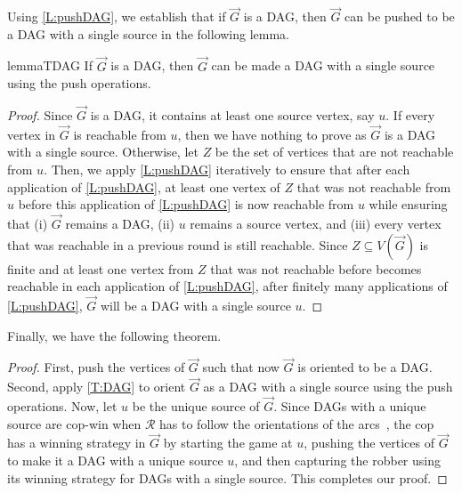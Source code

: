 \documentclass[a4paper,12pt]{amsart}
\newcommand{\R}{\mathcal{R}}
\begin{document}
Using \cref{L:pushDAG}, we establish that if $\overrightarrow{G}$ is a DAG, then $\overrightarrow{G}$ can be pushed to be a DAG with a single source in the following lemma. 
\begin{restatable}{lemma}{TDAG}\label{T:DAG}
    If $\overrightarrow{G}$ is a DAG, then $\overrightarrow{G}$ can be made a DAG with a single source using the push operations. 
\end{restatable}
\begin{proof}
    Since $\overrightarrow{G}$ is a DAG, it contains at least one source vertex, say $u$. If every vertex in $\overrightarrow{G}$ is reachable from $u$, then we have nothing to prove as $\overrightarrow{G}$ is a DAG with a single source. Otherwise, let $Z$ be the set of vertices that are not reachable from $u$. Then, we apply \cref{L:pushDAG} iteratively to ensure that after each application of \cref{L:pushDAG}, at least one vertex of $Z$ that was not reachable from $u$ before this application of \cref{L:pushDAG} is now reachable from $u$ while ensuring that (i) $\overrightarrow{G}$ remains a DAG, (ii) $u$ remains a source vertex, and (iii) every vertex that was reachable in a previous round is still reachable. Since $Z\subseteq V(\overrightarrow{G})$  is finite and at least one vertex from $Z$ that was not reachable before becomes reachable in each application of \cref{L:pushDAG}, after finitely many applications of \cref{L:pushDAG}, $\overrightarrow{G}$ will be a DAG with a single source $u$.
\end{proof}

Finally, we have the following theorem.
\PushDag*
\begin{proof}
    First, push the vertices of  $\overrightarrow{G}$ such that now $\overrightarrow{G}$ is oriented to be a DAG. Second, apply \cref{T:DAG} to orient $\overrightarrow{G}$ as a DAG with a single source using the push operations. Now, let $u$ be the unique source of $\overrightarrow{G}$. Since DAGs with a unique source are cop-win when $\R$ has to follow the orientations of the arcs~\cite{das2021cops}, the cop has a winning strategy in $\overrightarrow{G}$ by starting the game at $u$, pushing the vertices of $\overrightarrow{G}$ to make it a DAG with a unique source $u$, and then capturing the robber using its winning strategy for DAGs with a single source.  This completes our proof. 
\end{proof}
\end{document}
